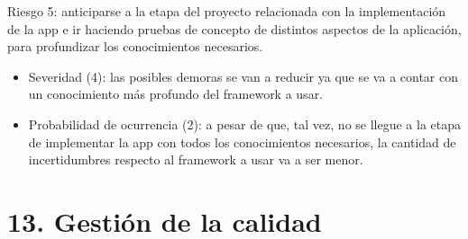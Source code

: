 \documentclass[
11pt, %
codirector, %
]{charter}
\begin{document}
Riesgo 5: anticiparse a la etapa del proyecto relacionada con la implementación de la app e ir haciendo pruebas de concepto de distintos aspectos de la aplicación,  para profundizar los conocimientos necesarios.
\begin{itemize}
  \item Severidad (4): las posibles demoras se van a reducir ya que se va a contar con un conocimiento más profundo del framework a usar.
  \item Probabilidad de ocurrencia (2): a pesar de que, tal vez, no se llegue a la etapa de implementar la app con todos los conocimientos necesarios, la cantidad de incertidumbres respecto al framework a usar va a ser menor. 
\end{itemize} 



\section{13. Gestión de la calidad}
\label{sec:calidad}

\end{document}
